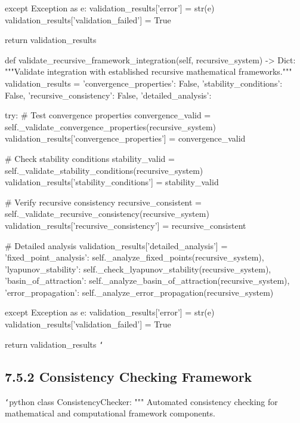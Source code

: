         except Exception as e:
            validation_results['error'] = str(e)
            validation_results['validation_failed'] = True
            
        return validation_results
        
    def validate_recursive_framework_integration(self, recursive_system) -> Dict:
        """Validate integration with established recursive mathematical frameworks."""
        validation_results = {
            'convergence_properties': False,
            'stability_conditions': False,
            'recursive_consistency': False,
            'detailed_analysis': {}
        }
        
        try:
            \# Test convergence properties
            convergence_valid = self._validate_convergence_properties(recursive_system)
            validation_results['convergence_properties'] = convergence_valid
            
            \# Check stability conditions
            stability_valid = self._validate_stability_conditions(recursive_system)
            validation_results['stability_conditions'] = stability_valid
            
            \# Verify recursive consistency
            recursive_consistent = self._validate_recursive_consistency(recursive_system)
            validation_results['recursive_consistency'] = recursive_consistent
            
            \# Detailed analysis
            validation_results['detailed_analysis'] = {
                'fixed_point_analysis': self._analyze_fixed_points(recursive_system),
                'lyapunov_stability': self._check_lyapunov_stability(recursive_system),
                'basin_of_attraction': self._analyze_basin_of_attraction(recursive_system),
                'error_propagation': self._analyze_error_propagation(recursive_system)
            }
            
        except Exception as e:
            validation_results['error'] = str(e)
            validation_results['validation_failed'] = True
            
        return validation_results
\texttt{`}

\subsection{7.5.2 Consistency Checking Framework}

\texttt{`}python
class ConsistencyChecker:
    """
    Automated consistency checking for mathematical and computational framework components.
    
